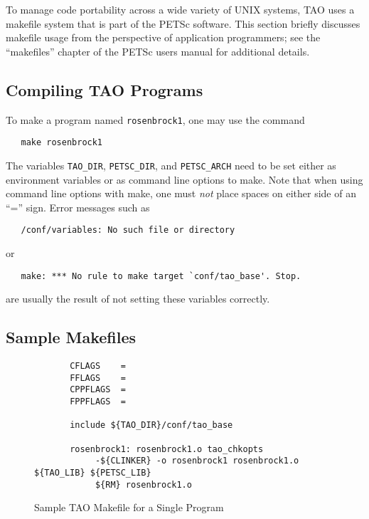 To manage code portability across a wide variety of UNIX systems, TAO
uses a makefile system that is part of the PETSc software.  This
section briefly discusses makefile usage from the perspective of
application programmers; see the ``makefiles'' chapter of the PETSc
users manual for additional details.

\subsection*{Compiling TAO Programs}

To make a program named \texttt{rosenbrock1}, one may use the command
\begin{verbatim}
   make rosenbrock1
\end{verbatim}
\noindent
The variables \texttt{TAO\_DIR}, \texttt{PETSC\_DIR}, and \texttt{PETSC\_ARCH}
need to be set either as environment variables or as command line options to make.  Note that
when using command line options with make, one
must {\em not} place spaces on either side of an ``='' sign. Error messages
such as 
\begin{verbatim}
   /conf/variables: No such file or directory
\end{verbatim}
or
\begin{verbatim}
   make: *** No rule to make target `conf/tao_base'. Stop.
\end{verbatim}
are usually the result of not setting these variables correctly.


\subsection*{Sample Makefiles}

\begin{figure}[tbh]
{\footnotesize
\begin{verbatim}   
       CFLAGS    = 
       FFLAGS    = 
       CPPFLAGS  =
       FPPFLAGS  =
       
       include ${TAO_DIR}/conf/tao_base
   
       rosenbrock1: rosenbrock1.o tao_chkopts
            -${CLINKER} -o rosenbrock1 rosenbrock1.o ${TAO_LIB} ${PETSC_LIB}
            ${RM} rosenbrock1.o
\end{verbatim} 
}
\caption{Sample TAO Makefile for a Single Program}
\label{fig:make1}
\end{figure}


